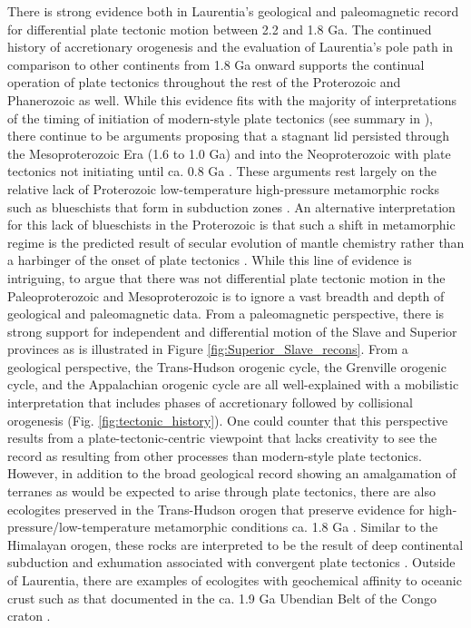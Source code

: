 \documentclass[11pt,letterpaper]{article}
\begin{document}
There is strong evidence both in Laurentia's geological and paleomagnetic record for differential plate tectonic motion between 2.2 and 1.8 Ga. The continued history of accretionary orogenesis and the evaluation of Laurentia's pole path in comparison to other continents from 1.8 Ga onward supports the continual operation of plate tectonics throughout the rest of the Proterozoic and Phanerozoic as well. While this evidence fits with the majority of interpretations of the timing of initiation of modern-style plate tectonics (see summary in \citealp{Korenaga2013a}), there continue to be arguments proposing that a stagnant lid persisted through the Mesoproterozoic Era (1.6 to 1.0 Ga) and into the Neoproterozoic  with plate tectonics not initiating until ca. 0.8 Ga \citep{Hamilton2011a, Stern2018a}. These arguments rest largely on the relative lack of Proterozoic low-temperature high-pressure metamorphic rocks such as blueschists that form in subduction zones \citep{Stern2013a}. An alternative interpretation for this lack of blueschists in the Proterozoic is that such a shift in metamorphic regime is the predicted result of secular evolution of mantle chemistry rather than a harbinger of the onset of plate tectonics \citep{Palin2015a}. While this line of evidence is intriguing, to argue that there was not differential plate tectonic motion in the Paleoproterozoic and Mesoproterozoic is to ignore a vast breadth and depth of geological and paleomagnetic data. From a paleomagnetic perspective, there is strong support for independent and differential motion of the Slave and Superior provinces as is illustrated in Figure \ref{fig:Superior_Slave_recons}. From a geological perspective, the Trans-Hudson orogenic cycle, the Grenville orogenic cycle, and the Appalachian orogenic cycle are all well-explained with a mobilistic interpretation that includes phases of accretionary followed by collisional orogenesis (Fig. \ref{fig:tectonic_history}). One could counter that this perspective results from a plate-tectonic-centric viewpoint that lacks creativity to see the record as resulting from other processes than modern-style plate tectonics. However, in addition to the broad geological record showing an amalgamation of terranes as would be expected to arise through plate tectonics, there are also ecologites preserved in the Trans-Hudson orogen that preserve evidence for high-pressure/low-temperature metamorphic conditions ca. 1.8 Ga \citep{Weller2017a}. Similar to the Himalayan orogen, these rocks are interpreted to be the result of deep continental subduction and exhumation associated with convergent plate tectonics \citep{Weller2017a}. Outside of Laurentia, there are examples of ecologites with geochemical affinity to oceanic crust such as that documented in the ca. 1.9 Ga Ubendian Belt of the Congo craton \citep{Boniface2012a}.
\end{document}
